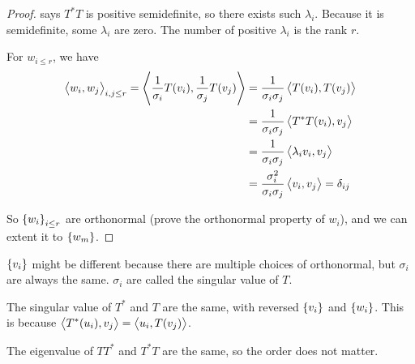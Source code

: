 \begin{proof}
     says $T^*T$ is positive semidefinite, so there exists such $\lambda_i$. Because it is semidefinite, some $\lambda_i$ are zero. The number of positive $\lambda_i$ is the rank $r$.
    
    For $w_{i\leq r}$, we have
    \begin{equation}
        \begin{aligned}
            \left\langle \displaystyle w_i, w_j \right\rangle_{i,j \leq r} = \left\langle \displaystyle \frac{1}{\sigma_i} T(v_i), \frac{1}{\sigma_j} T(v_j) \right\rangle &= \frac{1}{\sigma_i \sigma_j} \left\langle \displaystyle T(v_i), T(v_j) \right\rangle \\
             &= \frac{1}{\sigma_i \sigma_j} \left\langle \displaystyle T^*T(v_i), v_j \right\rangle \\
             &= \frac{1}{\sigma_i \sigma_j} \left\langle \displaystyle \lambda_i v_i, v_j \right\rangle \\
             &= \frac{\sigma_i^2}{\sigma_i \sigma_j} \left\langle \displaystyle v_i, v_j \right\rangle = \delta_{ij}
        \end{aligned}        
    \end{equation}
    
    So $\set{w_i}_{i \leq r}$ are orthonormal (prove the orthonormal property of $w_i$), and we can extent it to $\set{w_m}$.
\end{proof}


\begin{definition}
    $\set{v_i}$ might be different because there are multiple choices of orthonormal, but $\sigma_i$ are always the same. $\sigma_i$ are called the singular value of $T$.
\end{definition}


The singular value of $T^*$ and $T$ are the same, with reversed $\set{v_i}$ and $\set{w_i}$. This is because $\left\langle \displaystyle T^*(u_i), v_j \right\rangle = \left\langle \displaystyle u_i, T(v_j) \right\rangle$.


The eigenvalue of $TT^*$ and $T^*T$ are the same, so the order does not matter.

